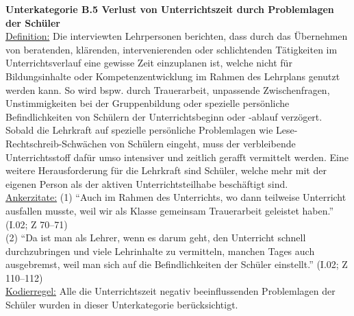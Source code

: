 \noindent
\textbf{Unterkategorie B.5 Verlust von Unterrichtszeit durch Problemlagen der Schüler}\\
\underline{Definition:} Die interviewten Lehrpersonen berichten, dass durch das Übernehmen von beratenden, klärenden, intervenierenden oder schlichtenden Tätigkeiten im Unterrichtsverlauf eine gewisse Zeit einzuplanen ist, welche nicht für Bildungsinhalte oder Kompetenzentwicklung im Rahmen des Lehrplans genutzt werden kann. So wird bspw. durch Trauerarbeit, unpassende Zwischenfragen, Unstimmigkeiten bei der Gruppenbildung oder spezielle persönliche Befindlichkeiten von Schülern der Unterrichtsbeginn oder -ablauf verzögert. Sobald die Lehrkraft auf spezielle persönliche Problemlagen wie Lese-Rechtschreib-Schwächen von Schülern eingeht, muss der verbleibende Unterrichtsstoff dafür umso intensiver und zeitlich gerafft vermittelt werden. Eine weitere Herausforderung für die Lehrkraft sind Schüler, welche mehr mit der eigenen Person als der aktiven Unterrichtsteilhabe beschäftigt sind.\\
\underline{Ankerzitate:} (1) "`Auch im Rahmen des Unterrichts, wo dann teilweise Unterricht ausfallen musste, weil wir als Klasse gemeinsam Trauerarbeit geleistet haben."' (I.02; Z 70--71)\\ (2) "`Da ist man als Lehrer, wenn es darum geht, den Unterricht schnell durchzubringen und viele Lehrinhalte zu vermitteln, manchen Tages auch ausgebremst, weil man sich auf die Befindlichkeiten der Schüler einstellt."' (I.02; Z 110--112)\\
\underline{Kodierregel:} Alle die Unterrichtszeit negativ beeinflussenden Problemlagen der Schüler wurden in dieser Unterkategorie berücksichtigt.\\

